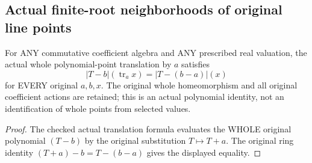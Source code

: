 \subsection{Actual finite-root neighborhoods of original line points}

\begin{lemma}
\label{analytic:actual-translation-all-linear-values}
For ANY commutative coefficient algebra and ANY prescribed real valuation,
the actual whole polynomial-point translation by $a$ satisfies
\[
 |T-b|(\operatorname{tr}_a x)=|T-(b-a)|(x)
\]
for EVERY original $a,b,x$. The original whole homeomorphism and all original
coefficient actions are retained; this is an actual polynomial identity,
not an identification of whole points from selected values.
\leanok
\end{lemma}
\begin{proof}
The checked actual translation formula evaluates the WHOLE original
polynomial $(T-b)$ by the original substitution $T\mapsto T+a$.
The original ring identity $(T+a)-b=T-(b-a)$ gives the displayed equality.
\end{proof}

